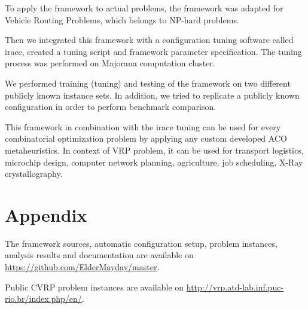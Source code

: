 \documentclass[11pt,a4paper,oneside]{book}
\begin{document}
To apply the framework to actual problems, the framework was adapted for Vehicle Routing Problems, which belongs to NP-hard problems.

Then we integrated this framework with a configuration tuning software called irace, created a tuning script and framework parameter specification. The tuning process was performed on Majorana computation cluster.

We performed training (tuning) and testing of the framework on two different publicly known instance sets. In addition, we tried to replicate a publicly known configuration in order to perform benchmark comparison.

This framework in combination with the irace tuning can be used for every combinatorial optimization problem by applying any custom developed ACO metaheuristics. In context of VRP problem, it can be used for transport logistics, microchip design, computer network planning, agriculture, job scheduling, X-Ray crystallography.



\appendix

\backmatter

\printindex %







\chapter{Appendix}

The framework sources, automatic configuration setup, problem instances, analysis results and documentation are available on \url{https://github.com/ElderMayday/master}.

Public CVRP problem instances are available on \url{http://vrp.atd-lab.inf.puc-rio.br/index.php/en/}.
\end{document}
